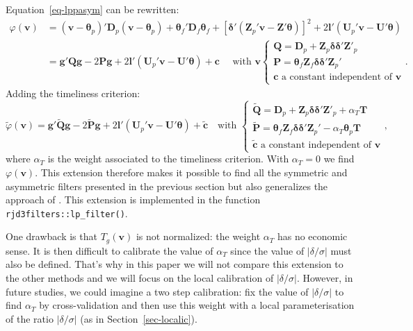 \documentclass[
]{article}
\newcommand\1{\mathds{1}}
\begin{document}
Equation~\ref{eq-lppasym} can be rewritten: \begin{align*}
\varphi(\boldsymbol v)&=(\boldsymbol v-\boldsymbol \theta_p)'\boldsymbol D_{p}(\boldsymbol v-\boldsymbol \theta_p)+
  \boldsymbol \theta_f'\boldsymbol D_{f}\boldsymbol \theta_f+
  [\boldsymbol \delta'(\boldsymbol Z_{p}'\boldsymbol v-\boldsymbol Z'\boldsymbol \theta)]^{2}+
2\boldsymbol l'(\boldsymbol U_{p}'\boldsymbol v-\boldsymbol U'\boldsymbol \theta)\\
&=\boldsymbol g'\boldsymbol Q\boldsymbol g-2\boldsymbol P\boldsymbol g+2\boldsymbol l'(\boldsymbol U_{p}'\boldsymbol v-\boldsymbol U'\boldsymbol \theta)+\boldsymbol c\quad\text{ with }\boldsymbol v
\begin{cases}
\boldsymbol Q=\boldsymbol D_p+\boldsymbol Z_p\boldsymbol \delta\boldsymbol \delta'\boldsymbol Z'_p \\
\boldsymbol P=\boldsymbol \theta_f\boldsymbol Z_f\boldsymbol \delta\boldsymbol \delta'\boldsymbol Z_p'\\
\boldsymbol c\text{ a constant independent of }\boldsymbol v
\end{cases}.
\end{align*} Adding the timeliness criterion: \[
\widetilde\varphi(\boldsymbol v)=\boldsymbol g'\widetilde {\boldsymbol Q}\boldsymbol g-
2\widetilde {\boldsymbol P}\boldsymbol g+2\boldsymbol l'(\boldsymbol U_{p}'\boldsymbol v-\boldsymbol U'\boldsymbol \theta)+
\widetilde {\boldsymbol c}\quad\text{with }
\begin{cases}
\widetilde {\boldsymbol Q}=\boldsymbol D_p+\boldsymbol Z_p\boldsymbol \delta\boldsymbol \delta'\boldsymbol Z'_p + \alpha_T\boldsymbol T\\
\widetilde {\boldsymbol P}=\boldsymbol \theta_f\boldsymbol Z_f\boldsymbol \delta\boldsymbol \delta'\boldsymbol Z_p'-\alpha_T\boldsymbol \theta_p\boldsymbol T\\
\widetilde {\boldsymbol c}\text{ a constant independent of }\boldsymbol v
\end{cases},
\] where \(\alpha_T\) is the weight associated to the timeliness
criterion. With \(\alpha_T=0\) we find \(\varphi(\boldsymbol v)\). This
extension therefore makes it possible to find all the symmetric and
asymmetric filters presented in the previous section but also
generalizes the approach of \textcite{GrayThomson1996}. This extension
is implemented in the  function
\texttt{rjd3filters::lp\_filter()}.

One drawback is that \(T_g(\boldsymbol v)\) is not normalized: the
weight \(\alpha_T\) has no economic sense. It is then difficult to
calibrate the value of \(\alpha_T\) since the value of
\(\lvert\delta/\sigma\rvert\) must also be defined. That's why in this
paper we will not compare this extension to the other methods and we
will focus on the local calibration of \(\lvert\delta/\sigma\rvert\).
However, in future studies, we could imagine a two step calibration: fix
the value of \(\lvert\delta/\sigma\rvert\) to find \(\alpha_T\) by
cross-validation and then use this weight with a local parameterisation
of the ratio \(\lvert\delta/\sigma\rvert\) (as in
Section~\ref{sec-localic}).
\end{document}
